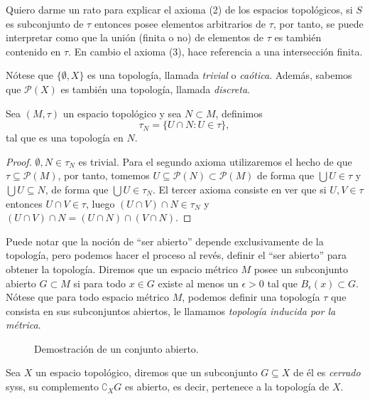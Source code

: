 \documentclass[11pt,oneside,a4paper]{book}
\renewcommand{\P}{\mathcal{P}}
\begin{document}
Quiero darme un rato para explicar el axioma (2) de los espacios topológicos, si $S$ es subconjunto de $\tau$ entonces posee elementos arbitrarios de $\tau$, por tanto, se puede interpretar como que la unión (finita o no) de elementos de $\tau$ es también contenido en $\tau$. En cambio el axioma (3), hace referencia a una intersección finita.

Nótese que $\{\emptyset,X\}$ es una topología, llamada \textit{trivial} o \textit{caótica}. Además, sabemos que $\P(X)$ es también una topología, llamada \textit{discreta}.
\begin{thm}
Sea $(M,\tau)$ un espacio topológico y sea $N\subset M$, definimos
$$\tau_N=\{U\cap N:U\in\tau\},$$
tal que es una topología en $N$.
\end{thm}
\begin{proof}
$\emptyset,N\in\tau_N$ es trivial. Para el segundo axioma utilizaremos el hecho de que $\tau\subseteq\P(M)$, por tanto, tomemos $U\subseteq\P(N)\subset\P(M)$ de forma que $\bigcup U\in\tau$ y $\bigcup U\subseteq N$, de forma que $\bigcup U\in\tau_N$. El tercer axioma consiste en ver que si $U,V\in\tau$ entonces $U\cap V\in\tau$, luego $(U\cap V)\cap N\in\tau_N$ y $(U\cap V)\cap N=(U\cap N)\cap(V\cap N)$.
\end{proof}
Puede notar que la noción de ``ser abierto'' depende exclusivamente de la topología, pero podemos hacer el proceso al revés, definir el ``ser abierto'' para obtener la topología. Diremos que un espacio métrico $M$ posee un subconjunto abierto $G\subset M$ si para todo $x\in G$ existe al menos un $\epsilon\gt 0$ tal que $B_\epsilon(x)\subset G$. Nótese que para todo espacio métrico $M$, podemos definir una topología $\tau$ que consista en sus subconjuntos abiertos, le llamamos \textit{topología inducida por la métrica}.
\begin{figure}
\centering
{}
\caption{Demostración de un conjunto abierto.}
\end{figure}
\begin{mydef}
Sea $X$ un espacio topológico, diremos que un subconjunto $G\subseteq X$ de él es \textit{cerrado} syss, su complemento $\complement_X G$ es abierto, es decir, pertenece a la topología de $X$.
\end{mydef}
\end{document}
